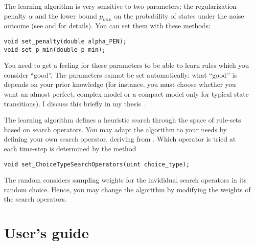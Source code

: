 \documentclass[10pt,twoside,twocolumn,fleqn]{article}
\begin{document}
The learning algorithm is very sensitive to two parameters: the
regularization penalty $\alpha$ and the lower bound $p_{min}$ on the
probability of states under the noise outcome (see
\cite{lang-toussaint-10jair} and \cite{pasula07ai} for details). You can
set them with these methods:
\begin{lstlisting}
void set_penalty(double alpha_PEN);
void set_p_min(double p_min);
\end{lstlisting}
You need to get a feeling for these parameters to be able to learn rules
which you consider ``good''. The parameters cannot be set automatically:
what ``good'' is  depends on your prior knowledge (for instance, you
must choose whether you want an almost perfect, complex model or a
compact model only for typical state transitions). I discuss this
briefly in my thesis \citep{11-lang-phd}.

The learning algorithm defines a heuristic search through the space of
rule-sets based on search operators. You may adapt the algorithm to your
needs by defining your own search operator, deriving from
. Which operator is tried at each time-step is
determined by the method
\begin{lstlisting}
void set_ChoiceTypeSearchOperators(uint choice_type);
\end{lstlisting}
The random  considers sampling weights for the
invididual search operators in its random choice. Hence, you may change
the algorithm by modifying the weights of the search operators.





\section{User's guide}
\end{document}

